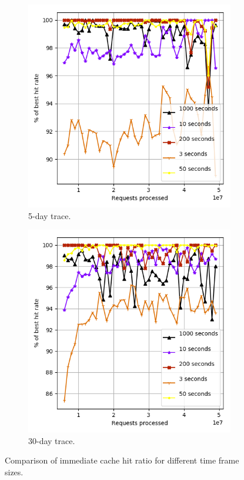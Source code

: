 \begin{figure}[t!]
	\centering
	\captionsetup{justification=centering}
	\begin{subfigure}[b]{0.49\linewidth}
		\includegraphics[width=\linewidth]{pics/cache7.png}
		\caption{5-day trace.}
	\end{subfigure}
	\begin{subfigure}[b]{0.49\linewidth}
		\includegraphics[width=\linewidth]{pics/cache7_2.png}
		\caption{30-day trace.}
	\end{subfigure}
	\caption{Comparison of immediate cache hit ratio for different time frame sizes.}
	\label{fig:cache7}
\end{figure}

